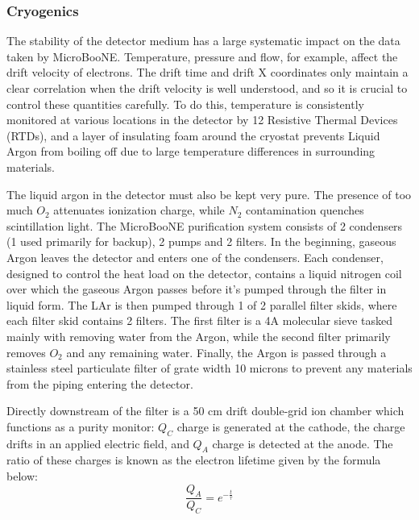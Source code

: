 \subsubsection{Cryogenics}
\par The stability of the detector medium has a large systematic impact on the data taken by MicroBooNE. Temperature, pressure and flow, for example, affect the drift velocity of electrons. The drift time and drift X coordinates only maintain a clear correlation when the drift velocity is well understood, and so it is crucial to control these quantities carefully. To do this, temperature is consistently monitored at various locations in the detector by 12 Resistive Thermal Devices (RTDs), and a layer of insulating foam around the cryostat prevents Liquid Argon from boiling off due to large temperature differences in surrounding materials.
\par The liquid argon in the detector must also be kept very pure. The presence of too much $O_2$ attenuates ionization charge, while $N_2$ contamination quenches scintillation light. The MicroBooNE purification system consists of 2 condensers (1 used primarily for backup), 2 pumps and 2 filters. In the beginning, gaseous Argon leaves the detector and enters one of the condensers. Each condenser, designed to control the heat load on the detector, contains a liquid nitrogen coil over which the gaseous Argon passes before it's pumped through the filter in liquid form. The LAr is then pumped through 1 of 2 parallel filter skids, where each filter skid contains 2 filters. The first filter is a 4A molecular sieve tasked mainly with removing water from the Argon, while the second filter primarily removes $O_2$ and any remaining water. Finally, the Argon is passed through a stainless steel particulate filter of grate width 10 microns to prevent any materials from the piping entering the detector. 
\par Directly downstream of the filter is a 50 cm drift double-grid ion chamber which functions as a purity monitor: $Q_C$ charge is generated at the cathode, the charge drifts in an applied electric field, and $Q_A$ charge is detected at the anode. The ratio of these charges is known as the electron lifetime given by the formula below: 
\begin{equation}
  \frac{Q_A}{Q_C} = e^{-\frac{t}{\tau}} 
\end{equation}

